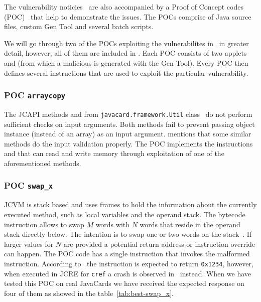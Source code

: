 \documentclass{../llncs/llncs}
\begin{document}

The vulnerability noticies~\cite{se:oracle:part1,se:oracle:part2,se:oracle:part3} are also accompanied by a Proof of Concept codes (POC)~\cite{se:downloadpage} that help to demonstrate the issues. The POCs comprise of Java source files, custom Gen Tool and several batch scripts.


We will go through two of the POCs exploiting the vulnerabilites in~\cite{se:oracle:part1,se:oracle:part2,se:oracle:part3} in greater detail, however, all of them are included in \projectname. Each POC consists of two applets \appletscap and \vulnscaporig (from which a malicious \vulnscap is generated with the Gen Tool). Every POC then defines several instructions that are used to exploit the particular vulnerability.

\subsubsection{POC \texttt{arraycopy}}\label{subsec:arraycopy-explanation}
The JCAPI methods \arrayCopy and \arrayCopyNonAtomic from \texttt{javacard.framework.Util} class~\cite{jcspecs31download} do not perform sufficient checks on input arguments. Both methods fail to prevent passing object instance (instead of an array) as an input argument. \cite{se:oracle:part1} mentions that some similar methods do the input validation properly. The POC implements the instructions \readmem and \writemem that can read and write memory through exploitation of one of the aforementioned methods.

\subsubsection{POC \texttt{swap_x}}
JCVM is stack based and uses frames to hold the information about the currently executed method, such as local variables and the operand stack. The bytecode instruction \swapx allows to swap $M$ words with $N$ words that reside in the operand stack directly below. The intention is to swap one or two words on the stack~\cite{jcspecs31download}. If larger values for $N$ are provided a potential return address or instruction override can happen.
The POC code has a single instruction \triggerswapx that invokes the malformed \swapx instruction. According to~\cite{se:oracle:part1} the instruction is expected to return \texttt{0x1234}, however, when executed in JCRE for \texttt{cref} a crash is observed in~\cite{se:oracle:part1} instead. When we have tested this POC on real JavaCards we have received the expected response on four of them as showed in the table~\ref{tab:best-swap_x}.
\end{document}
